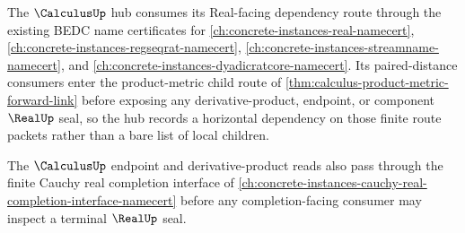 The $\CalculusUp$ hub consumes its Real-facing dependency route through the existing BEDC name certificates for \autoref{ch:concrete-instances-real-namecert}, \autoref{ch:concrete-instances-regseqrat-namecert}, \autoref{ch:concrete-instances-streamname-namecert}, and \autoref{ch:concrete-instances-dyadicratcore-namecert}. Its paired-distance consumers enter the product-metric child route of \autoref{thm:calculus-product-metric-forward-link} before exposing any derivative-product, endpoint, or component $\RealUp$ seal, so the hub records a horizontal dependency on those finite route packets rather than a bare list of local children.

The $\CalculusUp$ endpoint and derivative-product reads also pass through the finite Cauchy real completion interface of \autoref{ch:concrete-instances-cauchy-real-completion-interface-namecert} before any completion-facing consumer may inspect a terminal $\RealUp$ seal.
